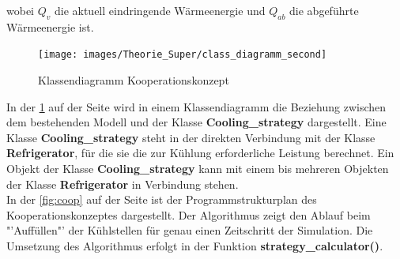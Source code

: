 wobei $Q_v$ die aktuell eindringende Wärmeenergie und $Q_{ab}$ die abgeführte
Wärmeenergie ist.

\begin{figure}[h!]
	\begin{center}
	\texttt{[image: images/Theorie\_Super/class\_diagramm\_second]}
	\end{center}
\caption{Klassendiagramm Kooperationskonzept}
\label{fig:klasskoop}
\end{figure}

In der \cref{fig:klasskoop} auf der Seite \pageref{fig:klasskoop} wird in einem
Klassendiagramm die Beziehung zwischen dem bestehenden Modell und der Klasse
\textbf{Cooling\_strategy} dargestellt. Eine Klasse \textbf{Cooling\_strategy}
steht in der direkten Verbindung mit der Klasse \textbf{Refrigerator}, f\"ur die
sie die zur K\"uhlung erforderliche Leistung berechnet. Ein Objekt der Klasse
\textbf{Cooling\_strategy} kann mit einem bis mehreren Objekten der Klasse
\textbf{Refrigerator} in Verbindung stehen.\\

In der \cref{fig:coop} auf der Seite \pageref{fig:coop} ist der
Programmstrukturplan des Kooperationskonzeptes dargestellt. Der Algorithmus
zeigt den Ablauf beim "'Auff\"ullen"' der K\"uhlstellen  f\"ur genau einen
Zeitschritt der Simulation. Die Umsetzung des Algorithmus erfolgt
in der Funktion \textbf{strategy\_calculator()}.

